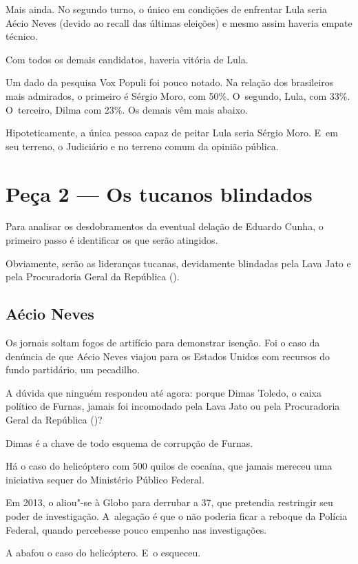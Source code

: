 Mais ainda. No segundo turno, o único em condições de enfrentar Lula
seria Aécio Neves (devido ao recall das últimas eleições) e mesmo assim
haveria empate técnico.

Com todos os demais candidatos, haveria vitória de Lula.

Um dado da pesquisa Vox Populi foi pouco notado. Na relação dos
brasileiros mais admirados, o primeiro é Sérgio Moro, com 50\%. O~segundo, Lula, com 33\%. O~terceiro, Dilma com 23\%. Os demais vêm mais
abaixo.

Hipoteticamente, a única pessoa capaz de peitar Lula seria Sérgio Moro.
E~em seu terreno, o Judiciário e no terreno comum da opinião pública.

\section{Peça 2 --- Os tucanos blindados}

Para analisar os desdobramentos da eventual delação de Eduardo Cunha, o
primeiro passo é identificar os que  serão atingidos.

Obviamente, serão as lideranças tucanas, devidamente blindadas pela Lava
Jato e pela Procuradoria Geral da República ().

\subsection{Aécio Neves}

Os jornais soltam fogos de artifício para demonstrar isenção. Foi o caso
da denúncia de que Aécio Neves viajou para os Estados Unidos com
recursos do fundo partidário, um pecadilho.

A dúvida que ninguém respondeu até agora: porque Dimas Toledo, o caixa
político de Furnas, jamais foi incomodado pela Lava Jato ou pela
Procuradoria Geral da República ()?

Dimas é a chave de todo esquema de corrupção de Furnas.

Há o caso do helicóptero com 500 quilos de cocaína, que jamais mereceu
uma iniciativa sequer do Ministério Público Federal.

Em 2013, o  aliou"-se à Globo para derrubar a  37, que pretendia
restringir seu poder de investigação. A~alegação é que o  não poderia
ficar a reboque da Polícia Federal, quando percebesse pouco empenho nas
investigações.

A  abafou o caso do helicóptero. E~o  esqueceu.

